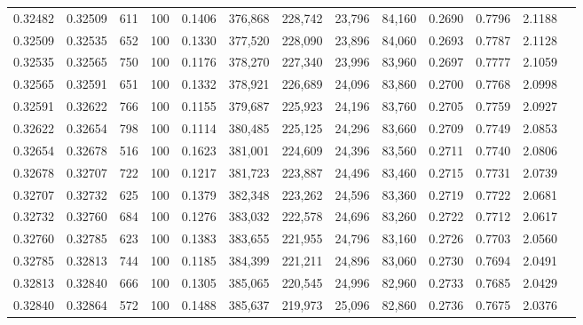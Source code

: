 \begin{tabular}{rrrrrrrrrrrrr}
0.32482 & 0.32509 &    611 & 100 &                                     0.1406 & 376,868 & 228,742 &  23,796 &  84,160 & 0.2690 & 0.7796 & 2.1188 \\
0.32509 & 0.32535 &    652 & 100 &                                     0.1330 & 377,520 & 228,090 &  23,896 &  84,060 & 0.2693 & 0.7787 & 2.1128 \\
0.32535 & 0.32565 &    750 & 100 &                                     0.1176 & 378,270 & 227,340 &  23,996 &  83,960 & 0.2697 & 0.7777 & 2.1059 \\
0.32565 & 0.32591 &    651 & 100 &                                     0.1332 & 378,921 & 226,689 &  24,096 &  83,860 & 0.2700 & 0.7768 & 2.0998 \\
0.32591 & 0.32622 &    766 & 100 &                                     0.1155 & 379,687 & 225,923 &  24,196 &  83,760 & 0.2705 & 0.7759 & 2.0927 \\
0.32622 & 0.32654 &    798 & 100 &                                     0.1114 & 380,485 & 225,125 &  24,296 &  83,660 & 0.2709 & 0.7749 & 2.0853 \\
0.32654 & 0.32678 &    516 & 100 &                                     0.1623 & 381,001 & 224,609 &  24,396 &  83,560 & 0.2711 & 0.7740 & 2.0806 \\
0.32678 & 0.32707 &    722 & 100 &                                     0.1217 & 381,723 & 223,887 &  24,496 &  83,460 & 0.2715 & 0.7731 & 2.0739 \\
0.32707 & 0.32732 &    625 & 100 &                                     0.1379 & 382,348 & 223,262 &  24,596 &  83,360 & 0.2719 & 0.7722 & 2.0681 \\
0.32732 & 0.32760 &    684 & 100 &                                     0.1276 & 383,032 & 222,578 &  24,696 &  83,260 & 0.2722 & 0.7712 & 2.0617 \\
0.32760 & 0.32785 &    623 & 100 &                                     0.1383 & 383,655 & 221,955 &  24,796 &  83,160 & 0.2726 & 0.7703 & 2.0560 \\
0.32785 & 0.32813 &    744 & 100 &                                     0.1185 & 384,399 & 221,211 &  24,896 &  83,060 & 0.2730 & 0.7694 & 2.0491 \\
0.32813 & 0.32840 &    666 & 100 &                                     0.1305 & 385,065 & 220,545 &  24,996 &  82,960 & 0.2733 & 0.7685 & 2.0429 \\
0.32840 & 0.32864 &    572 & 100 &                                     0.1488 & 385,637 & 219,973 &  25,096 &  82,860 & 0.2736 & 0.7675 & 2.0376 \\

\end{tabular}
